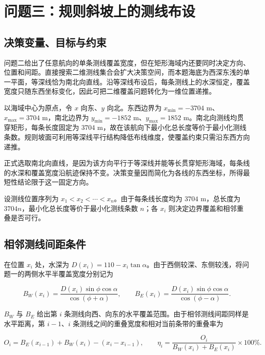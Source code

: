 \section{问题三：规则斜坡上的测线布设}

\subsection{决策变量、目标与约束}

问题二给出了任意航向的单条测线覆盖宽度，但在矩形海域内还要同时决定方向、位置和间距。直接搜索二维测线集合会扩大决策空间，而本题海底为西深东浅的单一平面，等深线恰为南北向直线。沿等深线布设后，每条测线上的水深恒定，覆盖宽度只随东西坐标变化，因此可把二维覆盖问题转化为一维位置递推。

以海域中心为原点，令 $x$ 向东、$y$ 向北。东西边界为 $x_{\min}=-3704\text{ m}$、$x_{\max}=3704\text{ m}$，南北边界为 $y_{\min}=-1852\text{ m}$、$y_{\max}=1852\text{ m}$。南北向测线均贯穿矩形，每条长度固定为 $3704\text{ m}$，故在该航向下最小化总长度等价于最小化测线条数。规则坡面可利用等深线平行结构降低布线维度，使覆盖约束只需沿东西方向递推。

正式选取南北向直线，是因为该方向平行于等深线并能等长贯穿矩形海域，每条线的水深和覆盖宽度沿航迹保持不变。决策变量因而简化为各线的东西坐标，所得最短性结论限于这一固定方向。

设测线位置序列为 $x_1<x_2<\cdots<x_n$。由于每条线长度均为 $3704\text{ m}$，总长度为 $3704n$，最小化总长度等价于最小化测线条数 $n$；各 $x_i$ 则决定边界覆盖和相邻重叠是否可行。

\subsection{相邻测线间距条件}

在位置 $x_i$ 处，水深为 $D(x_i)=110-x_i\tan\alpha$。由于西侧较深、东侧较浅，将问题一的两侧水平半覆盖宽度分别记为

\begin{equation}
  B_W(x_i)=\frac{D(x_i)\sin\phi\cos\alpha}{\cos(\phi+\alpha)},\qquad
  B_E(x_i)=\frac{D(x_i)\sin\phi\cos\alpha}{\cos(\phi-\alpha)}.
\end{equation}

$B_W$ 与 $B_E$ 给出第 $i$ 条测线向西、向东的水平覆盖范围。由于相邻测线间距同样是水平距离，第 $i-1$、$i$ 条测线之间的重叠宽度和相对当前条带的重叠率为

\begin{equation}
  O_i=B_E(x_{i-1})+B_W(x_i)-(x_i-x_{i-1}),\qquad
  \eta_i=\frac{O_i}{B_W(x_i)+B_E(x_i)}\times100\%.
\end{equation}

